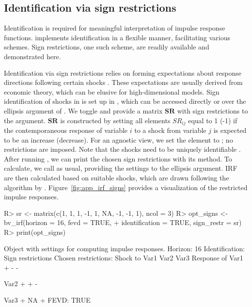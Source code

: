 \documentclass[article,nojss]{jss} %
\begin{document}
\begin{appendix}
\section{Identification via sign restrictions} \label{app:signs}

Identification is required for meaningful interpretation of impulse response functions.  implements identification in a flexible manner, facilitating various schemes. Sign restrictions, one such scheme, are readily available and demonstrated here.

Identification via sign restrictions relies on forming expectations about response directions following certain shocks \citep{rubio-ramirez2010}. These expectations are usually derived from economic theory, which can be elusive for high-dimensional models.
Sign identification of shocks in  is set up in , which can be accessed directly or over the ellipsis argument of . We toggle  and provide a matrix $\mathbf{SR}$ with sign restrictions to the  argument. $\mathbf{SR}$ is constructed by setting all elements $SR_{ij}$ equal to 1 (-1) if the contemporaneous response of variable $i$ to a shock from variable $j$ is expected to be an increase (decrease). For an agnostic view, we set the element to ; no restrictions are imposed. Note that the shocks need to be uniquely identifiable \citep{kilian2017}.
After running , we can print the chosen sign restrictions with its  method. To calculate, we call  as usual, providing the settings to the ellipsis argument. IRF are then calculated based on suitable shocks, which are drawn following the algorithm by \cite{rubio-ramirez2010}. Figure~\ref{fig:app_irf_signs} provides a visualization of the restricted impulse responses.

\begin{Schunk}
\begin{Sinput}
R> sr <- matrix(c(1, 1, 1, -1, 1, NA, -1, -1, 1), ncol = 3)
R> opt_signs <- bv_irf(horizon = 16, fevd = TRUE,
+    identification = TRUE, sign_restr = sr)
R> print(opt_signs)
\end{Sinput}
\begin{Soutput}
Object with settings for computing impulse responses.
Horizon: 16
Identification: Sign restrictions
Chosen restrictions:
			Shock to
			 Var1	 Var2	 Var3	 
Response of	Var1	 +	 -	 -	

		Var2	 +	 +	 -	

		Var3	 +	 NA	 +	
FEVD: TRUE
\end{Soutput}
\end{Schunk}


\end{appendix}
\end{document}
